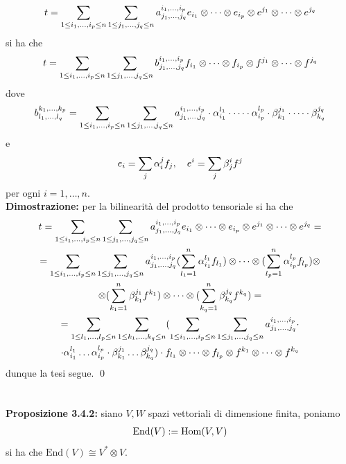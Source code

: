 \documentclass{article}
\begin{document}
\begin{gather}
    t = \sum_{1 \leq i_1, \dots, i_p \leq n} \sum_{1 \leq j_1, \dots, j_q \leq n} a^{i_1, \dots, i_p}_{j_1, \dots, j_q} e_{i_1} \otimes \dots \otimes e_{i_p} \otimes e^{j_1} \otimes \dots \otimes e^{j_q} \notag
\end{gather}
si ha che
\begin{gather}
    t = \sum_{1 \leq i_1, \dots, i_p \leq n} \sum_{1 \leq j_1, \dots, j_q \leq n} b^{i_1, \dots, i_p}_{j_1, \dots, j_q} f_{i_1} \otimes \dots \otimes f_{i_p} \otimes f^{j_1} \otimes \dots \otimes f^{j_q} \notag
\end{gather}
dove
\begin{gather}
    b^{k_1, \dots, k_p}_{l_1, \dots, l_q} = \sum_{1 \leq i_1, \dots, i_p \leq n} \sum_{1 \leq j_1, \dots, j_q \leq n} a^{i_1, \dots, i_p}_{j_1, \dots, j_q} \cdot \alpha^{l_1}_{i_1} \cdot \dots \cdot \alpha^{l_p}_{i_p} \cdot \beta^{j_1}_{k_1} \cdot \dots \cdot \beta^{j_q}_{k_q} \notag
\end{gather}
e
\begin{gather}
    e_i = \sum_{j} \alpha_i^j f_j, \quad e^i = \sum_j \beta^i_j f^j \notag
\end{gather}
per ogni $i = 1, \dots, n$. \\

\textbf{Dimostrazione:} per la bilinearità del prodotto tensoriale si ha che
\begin{gather*}
    t = \sum_{1 \leq i_1, \dots, i_p \leq n} \sum_{1 \leq j_1, \dots, j_q \leq n} a^{i_1, \dots, i_p}_{j_1, \dots, j_q} e_{i_1} \otimes \dots \otimes e_{i_p} \otimes e^{j_1} \otimes \dots \otimes e^{j_q} = \notag \\
    = \sum_{1 \leq i_1, \dots, i_p \leq n} \sum_{1 \leq j_1, \dots, j_q \leq n} a^{i_1, \dots, i_p}_{j_1, \dots, j_q} (\sum_{l_1 = 1}^n \alpha_{i_1}^{l_1}f_{l_1}) \otimes \dots \otimes (\sum_{l_p = 1}^n \alpha_{i_p}^{l_p}f_{l_p}) \otimes \notag \\
    \otimes (\sum_{k_1 = 1}^n \beta^{j_1}_{k_1} f^{k_1}) \otimes \dots \otimes (\sum_{k_q = 1}^n \beta^{j_q}_{k_q} f^{k_q}) \notag = \\
    = \sum_{1 \leq l_1, \dots, l_p \leq n} \sum_{1 \leq k_1, \dots, k_q \leq n} (\sum_{1 \leq i_1, \dots, i_p \leq n} \sum_{1 \leq j_1, \dots, j_q \leq n} a^{i_1, \dots, i_p}_{j_1, \dots, j_q} \cdot \notag \\ 
    \cdot \alpha^{l_1}_{i_1} \dots \alpha^{l_p}_{i_p} \cdot \beta^{j_1}_{k_1} \dots \beta^{j_q}_{k_q}) \cdot f_{l_1} \otimes \dots \otimes f_{l_p} \otimes f^{k_1} \otimes \dots \otimes f^{k_q} \notag
\end{gather*}
dunque la tesi segue. \qed \\ \\ \\
\textbf{Proposizione 3.4.2:} siano $V, W$ spazi vettoriali di dimensione finita, poniamo
\begin{gather}
    \mathrm{End}(V) := \mathrm{Hom}(V, V) \notag
\end{gather}
si ha che $\mathrm{End}(V) \cong V^* \otimes V$. \\
\end{document}
